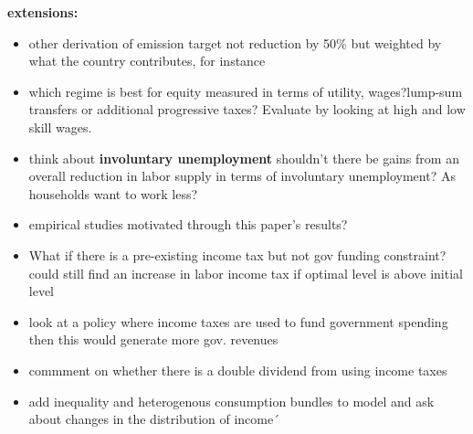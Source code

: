 \textbf{extensions:}
\begin{itemize}
	\item other derivation of emission target not reduction by 50\% but weighted by what the country contributes, for instance

	\item which  regime is best for equity measured in terms of utility, wages?lump-sum transfers or additional progressive taxes? \ar Evaluate by looking at high and low skill wages. 
	\item think about \textbf{involuntary unemployment} \ar shouldn't there be gains from an overall reduction in labor supply in terms of involuntary unemployment? As households want to work less?
	\item empirical studies motivated through this paper's results?
	\item  What if there is a pre-existing income tax but not gov funding constraint? could still find an increase in labor income tax if optimal level is above initial level
	\item  look at a policy where income taxes are used to fund government spending \ar then this would generate more gov. revenues
	\item commment on whether there is a double dividend from using income taxes
	\item add inequality and heterogenous consumption bundles to model and ask about changes in the distribution of income´
\end{itemize}
\begin{comment}
\paragraph{Extension: What if the low skilled get a higher share \ar they reduce even less \ar more fossil input supply}

Redistribution to households with a higher marginal propensity to consume emissions counteracts the externality. This effect is amplified by a market size effect  of dirty goods. 

content...
\end{comment}


